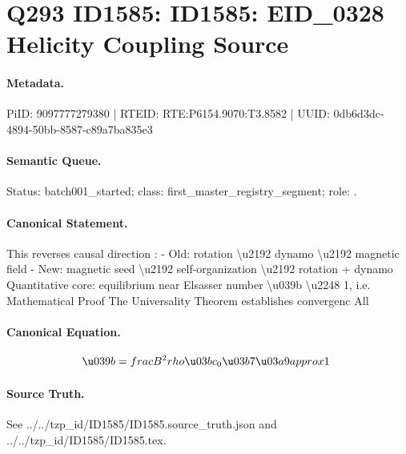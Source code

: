 \section*{Q293 ID1585: ID1585: EID\_0328 Helicity Coupling Source}
\paragraph{Metadata.}
PiID: 9097777279380 | RTEID: RTE:P6154.9070:T3.8582 | UUID: 0db6d3dc-4894-50bb-8587-c89a7ba835e3

\paragraph{Semantic Queue.}
Status: batch001\_started; class: first\_master\_registry\_segment; role: .

\paragraph{Canonical Statement.}
This reverses causal direction : - Old: rotation \textbackslash{}u2192 dynamo \textbackslash{}u2192 magnetic field - New: magnetic seed \textbackslash{}u2192 self-organization \textbackslash{}u2192 rotation + dynamo Quantitative core: equilibrium near Elsasser number \textbackslash{}u039b \textbackslash{}u2248 1, i.e. Mathematical Proof The Universality Theorem establishes convergenc All

\paragraph{Canonical Equation.}
\[
\u039b = \\frac{B^2}{\\rho \u03bc_0 \u03b7 \u03a9} \\approx 1 \
\]

\paragraph{Source Truth.}
See ../../tzp\_id/ID1585/ID1585.source\_truth.json and ../../tzp\_id/ID1585/ID1585.tex.
